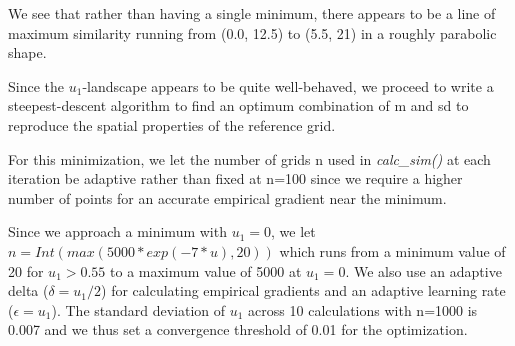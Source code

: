 \documentclass{article}
\begin{document}
We see that rather than having a single minimum, there appears to be a line of maximum similarity running from (0.0, 12.5) to (5.5, 21) in a roughly parabolic shape.

Since the $u_1$-landscape appears to be quite well-behaved, we proceed to write a steepest-descent algorithm to find an optimum combination of m and sd to reproduce the spatial properties of the reference grid.

For this minimization, we let the number of grids n used in \textit{calc\_sim()} at each iteration be adaptive rather than fixed at n=100 since we require a higher number of points for an accurate empirical gradient near the minimum.

Since we approach a minimum with $u_1=0$, we let $n = Int(max(5000*exp(-7*u), 20))$ which runs from a minimum value of 20 for $u_1 > 0.55$ to a maximum value of 5000 at $u_1 = 0$.
We also use an adaptive delta ($\delta = u_1/2$) for calculating empirical gradients and an adaptive learning rate ($\epsilon = u_1$).
The standard deviation of $u_1$ across 10 calculations with n=1000 is 0.007 and we thus set a convergence threshold of 0.01 for the optimization.
\end{document}
